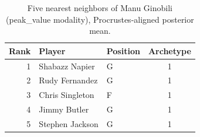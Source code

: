 \begin{table}[htbp]
  \centering\small
  \begin{tabular}{rllc}
    \toprule
    Rank & Player & Position & Archetype \\
    \midrule
    1 & Shabazz Napier & G & 1 \\
    2 & Rudy Fernandez & G & 1 \\
    3 & Chris Singleton & F & 1 \\
    4 & Jimmy Butler & G & 1 \\
    5 & Stephen Jackson & G & 1 \\
    \bottomrule
  \end{tabular}
  \caption{Five nearest neighbors of Manu Ginobili (peak_value modality), Procrustes-aligned posterior mean.}
  \label{tab:Manu_Ginobili_neighbors_peak_value}
\end{table}

